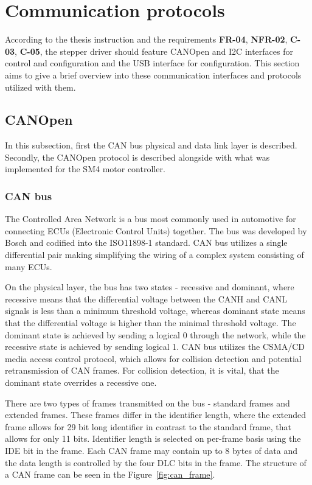 \section{Communication protocols}
\label{sec:comm_protocols}
According to the thesis instruction and the requirements \textbf{FR-04}, \textbf{NFR-02}, \textbf{C-03}, \textbf{C-05},  the stepper driver should feature CANOpen and I2C interfaces for control and configuration and the USB interface for configuration.
This section aims to give a brief overview into these communication interfaces and protocols utilized with them.

\subsection{CANOpen}
\label{subsec:canopen}
In this subsection, first the CAN bus physical and data link layer is described.
Secondly, the CANOpen protocol is described alongside with what was implemented for the SM4 motor controller.

\subsubsection{CAN bus}
The Controlled Area Network is a bus most commonly used in automotive for connecting ECUs (Electronic Control Units) together.
The bus was developed by Bosch and codified into the ISO11898-1 standard\cite{}.
CAN bus utilizes a single differential pair making simplifying the wiring of a complex system consisting of many ECUs.

On the physical layer, the bus has two states - recessive and dominant, where recessive means that the differential voltage between the CANH and CANL signals is less than a minimum threshold voltage, whereas dominant state means that the differential voltage is higher than the minimal threshold voltage.
The dominant state is achieved by sending a logical 0 through the network, while the recessive state is achieved by sending logical 1.
CAN bus utilizes the CSMA/CD media access control protocol, which allows for collision detection and potential retransmission of CAN frames.
For collision detection, it is vital, that the dominant state overrides a recessive one.

There are two types of frames transmitted on the bus - standard frames and extended frames.
These frames differ in the identifier length, where the extended frame allows for 29 bit long identifier in contrast to the standard frame, that allows for only 11 bits.
Identifier length is selected on per-frame basis using the IDE bit in the frame.
Each CAN frame may contain up to 8 bytes of data and the data length is controlled by the four DLC bits in the frame.
The structure of a CAN frame can be seen in the Figure~\ref{fig:can_frame}.

